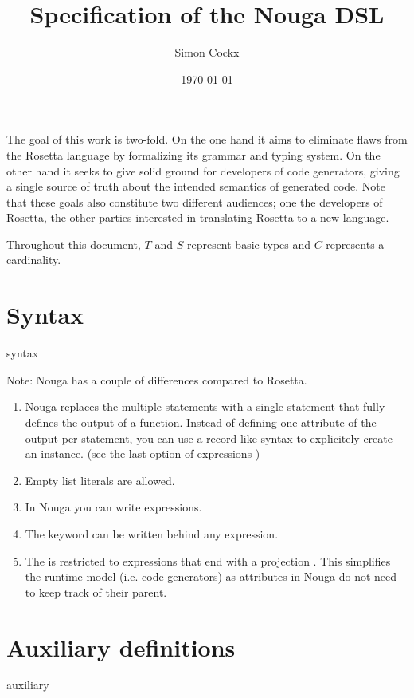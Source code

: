 \documentclass[english,11pt,a4paper]{article}
\title{Specification of the Nouga DSL}
\author{Simon Cockx}
\date{\today}
\begin{document}
\maketitle



The goal of this work is two-fold. On the one hand it aims to eliminate flaws from the Rosetta language by formalizing its grammar and typing system. On the other hand it seeks to give solid ground for developers of code generators, giving a single source of truth about the intended semantics of generated code. Note that these goals also constitute two different audiences; one the developers of Rosetta, the other parties interested in translating Rosetta to a new language.

Throughout this document, $T$ and $S$ represent basic types and $C$ represents a cardinality.

\section{Syntax}

{syntax}

Note: Nouga has a couple of differences compared to Rosetta.
\begin{enumerate}
\item Nouga replaces the multiple  statements with a single statement that fully defines the output of a function. Instead of defining one attribute of the output per  statement, you can use a record-like syntax to explicitely create an instance. (see the last option of expressions )
\item Empty list literals are allowed.
\item In Nouga you can write  expressions.
\item The  keyword can be written behind any expression.
\item The   is restricted to expressions that end with a projection \lit{->} . This simplifies the runtime model (i.e. code generators) as attributes in Nouga do not need to keep track of their parent.
\end{enumerate}


\section{Auxiliary definitions}

{auxiliary}
\end{document}
